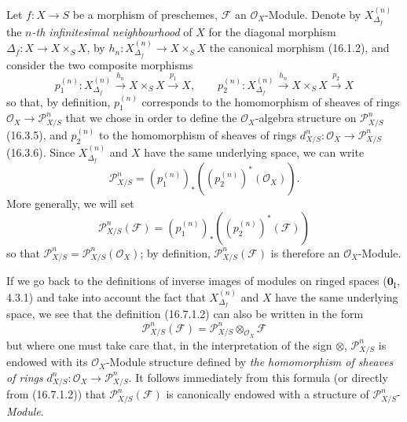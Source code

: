\begin{env}[16.7.1]
\label{IV.16.7.1}
Let $f:X\to S$ be a morphism of preschemes, $\mathscr{F}$ an
$\mathcal{O}_X$-Module. Denote by $X_{\Delta_f}^{(n)}$ the \emph{$n$-th
infinitesimal neighbourhood} of $X$ for the diagonal morphism
$\Delta_f:X\to X\times_S X$, by
$h_n:X_{\Delta_f}^{(n)}\to X\times_S X$ the canonical morphism (16.1.2), and
consider the two composite morphisms
\[
  p_1^{(n)}:X_{\Delta_f}^{(n)}\xrightarrow{h_n}X\times_S X
  \xrightarrow{p_1}X,\qquad
  p_2^{(n)}:X_{\Delta_f}^{(n)}\xrightarrow{h_n}X\times_S X
  \xrightarrow{p_2}X
\]
so that, by definition, $p_1^{(n)}$ corresponds to the homomorphism of
sheaves of rings $\mathcal{O}_X\to\mathscr{P}_{X/S}^n$ that we chose in order
to define the $\mathcal{O}_X$-algebra structure on
$\mathscr{P}_{X/S}^n$ (16.3.5), and $p_2^{(n)}$ to the homomorphism of sheaves
of rings $d_{X/S}^n:\mathcal{O}_X\to\mathscr{P}_{X/S}^n$ (16.3.6). Since
$X_{\Delta_f}^{(n)}$ and $X$ have the same underlying space, we can write
\[
  \mathscr{P}_{X/S}^n
  =(p_1^{(n)})_*((p_2^{(n)})^*(\mathcal{O}_X)).
  \tag{16.7.1.1}
  \label{IV.16.7.1.1}
\]
More generally, we will set
\[
  \mathscr{P}_{X/S}^n(\mathscr{F})
  =(p_1^{(n)})_*((p_2^{(n)})^*(\mathscr{F}))
  \tag{16.7.1.2}
  \label{IV.16.7.1.2}
\]
so that
$\mathscr{P}_{X/S}^n=\mathscr{P}_{X/S}^n(\mathcal{O}_X)$; by definition,
$\mathscr{P}_{X/S}^n(\mathscr{F})$ is therefore an $\mathcal{O}_X$-Module.
\end{env}

\begin{env}[16.7.2]
\label{IV.16.7.2}
If we go back to the definitions of inverse images of modules on ringed
spaces ($\mathbf{0}_{\mathrm I}$, 4.3.1) and take into account the fact that
$X_{\Delta_f}^{(n)}$ and $X$ have the same underlying space, we see that the
definition (16.7.1.2) can also be written in the form
\[
  \mathscr{P}_{X/S}^n(\mathscr{F})
  =\mathscr{P}_{X/S}^n\otimes_{\mathcal{O}_X}\mathscr{F}
  \tag{16.7.2.1}
  \label{IV.16.7.2.1}
\]
but where one must take care that, in the interpretation of the sign $\otimes$,
$\mathscr{P}_{X/S}^n$ is endowed with its $\mathcal{O}_X$-Module structure
defined by \emph{the homomorphism of sheaves of rings}
$d_{X/S}^n:\mathcal{O}_X\to\mathscr{P}_{X/S}^n$. It follows immediately from
this formula (or directly from (16.7.1.2)) that
$\mathscr{P}_{X/S}^n(\mathscr{F})$ is canonically endowed with a structure of
$\mathscr{P}_{X/S}^n$-\emph{Module}.
\end{env}

